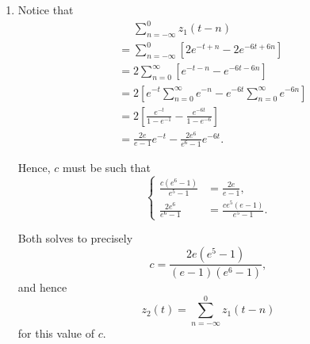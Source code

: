\begin{enumerate}
    \item Notice that
          \begin{align*}
               & \phantom{=} \sum_{n = -\infty}^{0} z_1(t - n)                                                \\
               & = \sum_{n = -\infty}^{0} [2e^{-t + n} - 2e^{-6t + 6n}]                                       \\
               & = 2\sum_{n = 0}^{\infty} [e^{-t-n} - e^{-6t-6n}]                                             \\
               & = 2 \left[e^{-t} \sum_{n = 0}^{\infty} e^{-n} - e^{-6t} \sum_{n = 0}^{\infty} e^{-6n}\right] \\
               & = 2 \left[\frac{e^{-t}}{1 - e^{-1}} - \frac{e^{-6t}}{1 - e^{-6}}\right]                      \\
               & = \frac{2e}{e - 1} e^{-t} - \frac{2e^6}{e^6 - 1} e^{-6t}.
          \end{align*}

          Hence, \(c\) must be such that
          \[
              \left\{
              \begin{aligned}
                  \frac{c(e^6 - 1)}{e^5 - 1} & = \frac{2e}{e - 1},             \\
                  \frac{2e^6}{e^6 - 1}       & = \frac{ce^5 (e - 1)}{e^5 - 1}.
              \end{aligned}
              \right.
          \]

          Both solves to precisely
          \[
              c = \frac{2e(e^5 - 1)}{(e - 1)(e^6 - 1)},
          \]
          and hence
          \[
              z_2(t) = \sum_{n = -\infty}^{0} z_1(t - n)
          \]
          for this value of \(c\).
\end{enumerate}